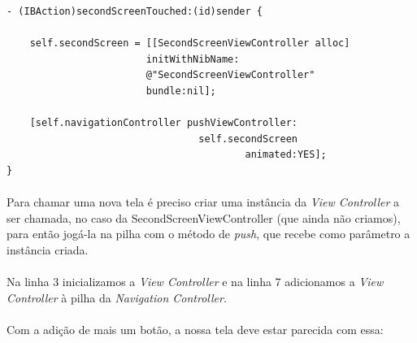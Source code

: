 \documentclass[a4paper,12pt,brazil,doubleside]{book}
\begin{document}
\begin{listing}
\begin{verbatim}
- (IBAction)secondScreenTouched:(id)sender {
    
    self.secondScreen = [[SecondScreenViewController alloc]
                        initWithNibName:
                        @"SecondScreenViewController"
                        bundle:nil];
    
    [self.navigationController pushViewController:
    							 self.secondScreen
                                         animated:YES];
}
\end{verbatim}
\end{listing}

\paragraph{}Para chamar uma nova tela é preciso criar uma instância da \emph{View Controller} a ser chamada, no caso da SecondScreenViewController (que ainda não criamos), para então jogá-la na pilha com o método de \emph{push}, que recebe como parâmetro a instância criada.
\paragraph{}Na linha 3 inicializamos a \emph{View Controller} e na linha 7 adicionamos a \emph{View Controller} à pilha da \emph{Navigation Controller}.
\paragraph{}Com a adição de mais um botão, a nossa tela deve estar parecida com essa:
\end{document}
